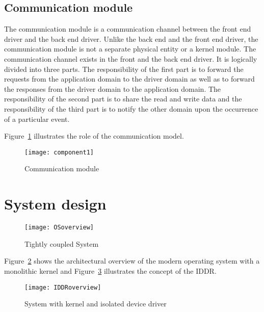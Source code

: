 \subsection{Communication module}
The communication module is a communication channel between the front end driver and the back end driver. Unlike the back end and the front end driver, the communication module is not a separate physical entity or a kernel module. The communication channel exists in the front and the back end driver. It is logically divided into three parts. The responsibility of the first part is to forward the requests from the application domain to the driver domain as well as to forward the responses from the driver domain to the application domain. The responsibility of the second part is to share the read and write data and the responsibility of the third part is to notify the other domain upon the occurrence of a particular event. 

Figure~\ref{fig:communication} illustrates the role of the communication model. 
\begin{figure}[!ht]
\centering
\texttt{[image: component1]}
\caption{Communication module}
\label{fig:communication}
\end{figure}

\section{System design}\label{design}
\begin{figure}[!ht]
\centering
\texttt{[image: OSoverview]}
\caption{Tightly coupled System}
\label{fig:monolithic}
\end{figure}
Figure~\ref{fig:monolithic} shows the architectural overview of the modern operating system with a monolithic kernel and Figure~\ref{fig:isolated} illustrates the concept of the IDDR.
\begin{figure}[!ht]
\centering
\texttt{[image: IDDRoverview]}
\caption{System with kernel and isolated device driver}
\label{fig:isolated}
\end{figure}

